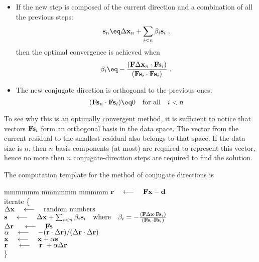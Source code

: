 \begin{itemize}
\item If the new step is
composed of the current direction and a combination of all the
previous steps:
\begin{equation}
  \label{eqn:sn}
  \bold s_n \eq \Delta \bold x_n + \sum_{i < n} \beta_i \bold s_i\;, 
\end{equation}
then the optimal convergence is achieved when
\begin{equation}
  \label{eqn:betai}
  \beta_i \eq - \frac{ (\bold F \Delta \bold x_n \cdot \bold F \bold s_i )}
  {(\bold F \bold s_i \cdot \bold F \bold s_i )}\;.
\end{equation}
\item The new conjugate direction is orthogonal to the previous ones:
  \begin{equation}
    \label{eqn:cdortho}
    (\bold F \bold s_n \cdot \bold F \bold s_i) \eq 0 
    \quad \mbox{for all} \quad i < n
  \end{equation}
\end{itemize}
\par
To see why this is an optimally convergent method, it is sufficient to
notice that vectors $\bold F \bold s_i$ form an orthogonal basis in
the data space. The vector from the current residual to the smallest
residual also belongs to that space. If the data size is $n$, then $n$
basis components (at most) are required to represent this vector, hence
no more then $n$ conjugate-direction steps are required to find the
solution.
\par
The computation template for the method of conjugate directions is
\label{'cdtemplate'}
\begin{tabbing}
mmmmmm \= mmmmmm \= mmmmm \kill
\> $\bold r \quad\longleftarrow\quad \bold F \bold x - \bold d$ \\
\> {\rm iterate \{ }                                                    \\
\>      \>  $\Delta \bold x   \padarrow {\rm random\ numbers}$          \\
\>      \>  $\bold s   \quad\longleftarrow\quad \Delta \bold x + 
\sum_{i < n} \beta_i \bold s_i \quad \mbox{\rm where} \quad 
\beta_i = - \frac{(\bold F \Delta \bold x \cdot \bold F \bold s_i )}
  {(\bold F \bold s_i \cdot \bold F \bold s_i )}$                       \\
\>      \>  $\Delta \bold r\  \quad\longleftarrow\quad \bold F \bold  s$               \\
\>      \> $\alpha \quad\longleftarrow\quad
                -(       \bold r \cdot \Delta\bold r )/
                 (\Delta \bold r \cdot \Delta\bold r )
                $
                \\
\>      \> $\bold x   \quad\longleftarrow\quad \bold x   + \alpha\bold s$              \\
\>      \> $\bold r\  \quad\longleftarrow\quad \bold r\  + \alpha\Delta \bold r$       \\
\>      \> \}                                                   
\end{tabbing}
